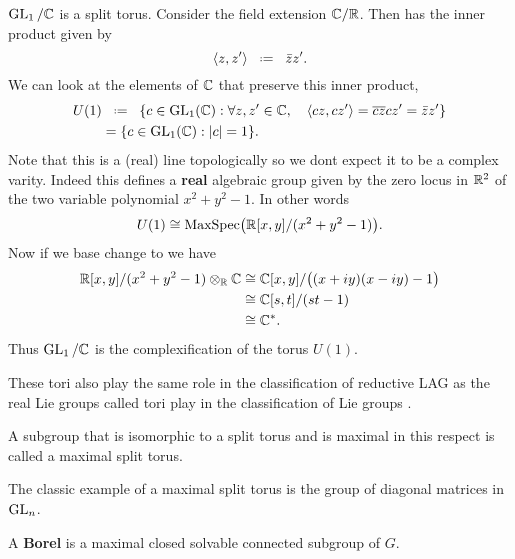     \begin{example}
        \(\GL_1 /\C\) is a split torus. Consider the field extension \(\C/\R\). Then \C has the inner product given by 
        \[\inner{z, z'} \defeq \bar{z}z'.\]
        We can look at the elements of \(\C\) that preserve this inner product, 
        \begin{align*}
            U(1)&\defeq \{c\in \GL_1(\C) : \forall z,z'\in \C , \quad \inner{cz, cz'} = \overline{cz}cz' = \bar{z}z'\} \\
             &= \{c\in \GL_1(\C) : |c| = 1\}.
        \end{align*}
        Note that this is a (real) line topologically so we dont expect it to be a complex varity. Indeed this defines a \textbf{real} algebraic group given by the zero locus in \(\R^2\) of the two variable polynomial \(x^2 + y^2 - 1\). In other words
        \[ U(1) \cong \mathrm{MaxSpec}\big(\R[x,y]/(x^2 + y^2 - 1)\big) .\]
        Now if we base change to \C we have 
        \begin{align*}
            \R[x,y]/(x^2 + y^2 - 1) \tensor_\R \C &\cong \C[x,y]/\big((x+iy)(x-iy) -1 \big)\\
             &\cong \C[s,t]/(st -1) \\
             &\cong \C^\ast.
        \end{align*}
        Thus \(\GL_1 / \C\) is the complexification of the torus \(U(1)\).
    \end{example}
    
    \begin{remark}
        These tori also play the same role in the classification of reductive LAG as the real Lie groups called tori play in the classification of Lie groups \cite{hallLieGroupsLie2015}.
    \end{remark}
    
    A subgroup that is isomorphic to a split torus and is maximal in this respect is called a maximal split torus. 
     \begin{example}
        The classic example of a maximal split torus is the group of diagonal matrices in \(\operatorname{GL}_n\).
     \end{example}

    A \textbf{Borel} is a maximal closed solvable connected subgroup of \(G\).


